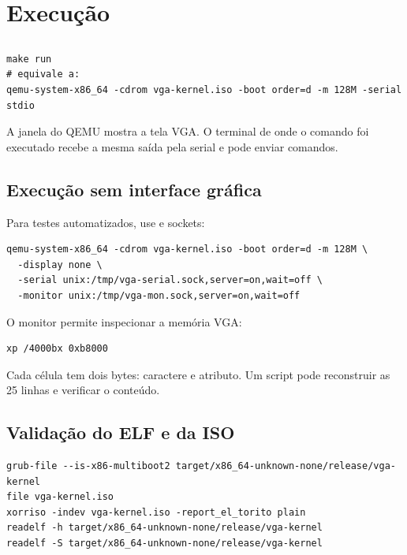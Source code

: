\section{Execu\c{c}\~ao}

\subsection{}

\begin{lstlisting}[style=shell,caption={Execu\c{c}\~ao padr\~ao.},label={lst:makerun}]
make run
# equivale a:
qemu-system-x86_64 -cdrom vga-kernel.iso -boot order=d -m 128M -serial stdio
\end{lstlisting}

A janela do QEMU mostra a tela VGA. O terminal de onde o comando foi
executado recebe a mesma sa\'ida pela serial e pode enviar comandos.

\subsection{Execu\c{c}\~ao sem interface gr\'afica}

Para testes automatizados, use  e sockets:

\begin{lstlisting}[style=shell,caption={QEMU headless com sockets de serial e monitor.},label={lst:qemuheadless}]
qemu-system-x86_64 -cdrom vga-kernel.iso -boot order=d -m 128M \
  -display none \
  -serial unix:/tmp/vga-serial.sock,server=on,wait=off \
  -monitor unix:/tmp/vga-mon.sock,server=on,wait=off
\end{lstlisting}

O monitor permite inspecionar a mem\'oria VGA:

\begin{lstlisting}[style=shell,caption={Dump da mem\'oria de texto VGA pelo monitor.},label={lst:vgadump}]
xp /4000bx 0xb8000
\end{lstlisting}

Cada c\'elula tem dois bytes: caractere e atributo. Um script pode reconstruir
as 25 linhas e verificar o conte\'udo.

\subsection{Valida\c{c}\~ao do ELF e da ISO}

\begin{lstlisting}[style=shell,caption={Verifica\c{c}\~oes \'uteis.},label={lst:validacoes}]
grub-file --is-x86-multiboot2 target/x86_64-unknown-none/release/vga-kernel
file vga-kernel.iso
xorriso -indev vga-kernel.iso -report_el_torito plain
readelf -h target/x86_64-unknown-none/release/vga-kernel
readelf -S target/x86_64-unknown-none/release/vga-kernel
\end{lstlisting}

